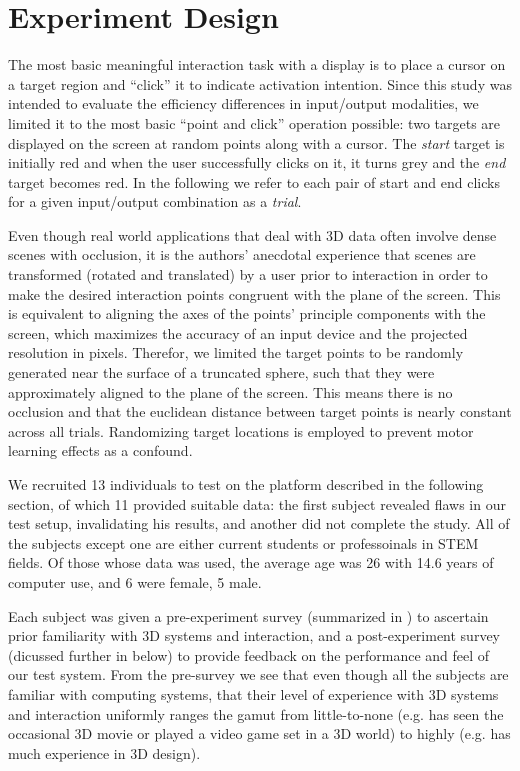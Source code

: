\section{Experiment Design}\label{sec:experiment}

The most basic meaningful interaction task with a display is to place a cursor
on a target region and ``click'' it to indicate activation intention.  Since
this study was intended to evaluate the efficiency differences in input/output
modalities, we limited it to the most basic ``point and click'' operation
possible: two targets are displayed on the screen at random points along with
a cursor.  The \emph{start} target is initially red and when the user
successfully clicks on it, it turns grey and the \emph{end} target becomes
red.  In the following we refer to each pair of start and end clicks for a
given input/output combination as a \emph{trial}.

Even though real world applications that deal with 3D data often involve dense
scenes with occlusion, it is the authors' anecdotal experience that scenes are
transformed (rotated and translated) by a user prior to interaction in order
to make the desired interaction points congruent with the plane of the screen.
This is equivalent to aligning the axes of the points' principle components
with the screen, which maximizes the accuracy of an input device and the
projected resolution in pixels.  Therefor, we limited the target points to be
randomly generated near the surface of a truncated sphere, such that they were
approximately aligned to the plane of the screen.  This means there is no
occlusion and that the euclidean distance between target points is nearly
constant across all trials.  Randomizing target locations is employed to
prevent motor learning effects as a confound.

We recruited 13 individuals to test on the platform described in the following
section, of which 11 provided suitable data: the first subject revealed flaws
in our test setup, invalidating his results, and another did not complete the
study.  All of the subjects except one are either current students or
professoinals in STEM fields.  Of those whose data was used, the average age
was 26 with 14.6 years of computer use, and 6 were female, 5 male.

Each subject was given a pre-experiment survey (summarized in
) to ascertain prior familiarity with 3D systems and
interaction, and a post-experiment survey (dicussed further in
below) to provide feedback on the performance and feel of our
test system.  From the pre-survey we see that even though all the subjects are
familiar with computing systems, that their level of experience with 3D
systems and interaction uniformly ranges the gamut from little-to-none
(e.g. has seen the occasional 3D movie or played a video game set in a 3D
world) to highly (e.g. has much experience in 3D design).

